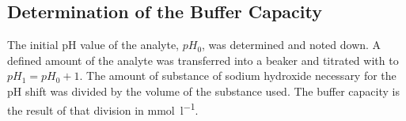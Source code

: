 \subsection{Determination of the Buffer Capacity\label{subsec-bufcap}}
The initial pH value of the analyte, $pH_{0}$, was determined and noted down. A defined amount of the analyte was transferred into a beaker and titrated with   to $pH_{1} = pH_{0} + 1$. The amount of substance of sodium hydroxide necessary for the pH shift was divided by the volume of the substance used. The buffer capacity is the result of that division in \si{\milli\mole\per\litre}.

